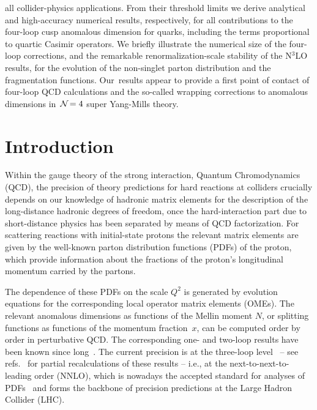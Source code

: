 \documentclass[12pt]{article}
\begin{document}
\begin{titlepage}
all collider-physics applications.  From their threshold limits we derive  
analytical and high-accuracy numerical results, respectively, for all
contributions to the four-loop cusp anomalous dimension for quarks, including 
the terms proportional to quartic Casimir operators.  We briefly illustrate the
numerical size of the four-loop corrections, and the remarkable 
renormalization-scale stability of the N$^3$LO results, for the evolution of 
the non-singlet parton distribution and the fragmentation functions.  
Our~results appear to provide a first point of contact of four-loop QCD
calculations and the so-called wrapping corrections to anomalous dimensions in
$\,{\cal N}\!=4$ super Yang-Mills theory.
%
\vspace*{0.3cm}
\end{titlepage}
%
%
\section{Introduction}
\label{sec:intro}

Within the gauge theory of the strong interaction, Quantum Chromodynamics 
(QCD), the precision of theory predictions for hard reactions at colliders 
crucially depends on our knowledge of hadronic matrix elements for the 
description of the long-distance hadronic degrees of freedom, 
once the hard-interaction part due to short-distance physics has been 
separated by means of QCD factorization.
For scattering reactions with initial-state protons the relevant matrix 
elements are given by the well-known parton distribution functions (PDFs) 
of the proton, which provide information about the fractions of the proton's 
longitudinal momentum carried by the partons.

The dependence of these PDFs on the scale $Q^2$ is generated by evolution 
equations for the corresponding local operator matrix elements (OMEs). 
The relevant anomalous dimensions as functions of the Mellin moment $N$, 
or splitting functions as functions of the momentum fraction~$x$, can be 
computed order by order in perturbative QCD.
The corresponding one- and two-loop results have been known since
long~\cite{Gross:1973ju,Georgi:1951sr,Altarelli:1977zs,Kim:1977hp,%
Floratos:1977au,Floratos:1978ny,GonzalezArroyo:1979df,GonzalezArroyo:1979he,%
Curci:1980uw,Furmanski:1980cm,Floratos:1981hs,Hamberg:1991qt,Ellis:1996nn}.
The current precision is at the three-loop level~\cite{Moch:2004pa,Vogt:2004mw}
-- see refs.~\cite{Ablinger:2010ty,Ablinger:2014vwa,Ablinger:2014nga,%
Ablinger:2017tan} for partial recalculations of these results --
i.e., at the next-to-next-to-leading order (NNLO), 
which is nowadays the accepted standard for analyses of 
PDFs~\cite{Accardi:2016ndt} and forms the backbone of precision predictions 
at the Large Hadron Collider (LHC).  
\end{document}
